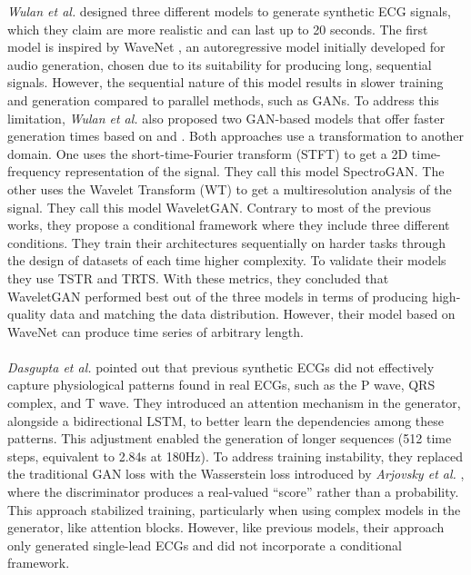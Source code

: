 \textit{Wulan et al.} \cite{wulan_generating_2020} designed three different models to generate synthetic ECG signals, which they claim are more realistic and can last up to 20 seconds. The first model is inspired by WaveNet \cite{oord_wavenet_2016}, an autoregressive model initially developed for audio generation, chosen due to its suitability for producing long, sequential signals. However, the sequential nature of this model results in slower training and generation compared to parallel methods, such as GANs. To address this limitation, \textit{Wulan et al.} also proposed two GAN-based models that offer faster generation times based on \cite{radford_unsupervised_2016} and \cite{gulrajani_improved_2017}. Both approaches use a transformation to another domain. One uses the short-time-Fourier transform (STFT) to get a 2D time-frequency representation of the signal. They call this model SpectroGAN. The other uses the Wavelet Transform (WT) to get a multiresolution analysis of the signal. They call this model WaveletGAN. Contrary to most of the previous works, they propose a conditional framework where they include three different conditions. They train their architectures sequentially on harder tasks through the design of datasets of each time higher complexity. To validate their models they use TSTR and TRTS. With these metrics, they concluded that WaveletGAN performed best out of the three models in terms of producing high-quality data and matching the data distribution. However, their model based on WaveNet can produce time series of arbitrary length.
\\ \\
\textit{Dasgupta et al.} \cite{dasgupta_cardiogan_2021} pointed out that previous synthetic ECGs did not effectively capture physiological patterns found in real ECGs, such as the P wave, QRS complex, and T wave. They introduced an attention mechanism in the generator, alongside a bidirectional LSTM, to better learn the dependencies among these patterns. This adjustment enabled the generation of longer sequences (512 time steps, equivalent to 2.84s at 180Hz). To address training instability, they replaced the traditional GAN loss \cite{goodfellow_generative_2014} with the Wasserstein loss introduced by \textit{Arjovsky et al.} \cite{arjovsky_wasserstein_2017}, where the discriminator produces a real-valued “score” rather than a probability. This approach stabilized training, particularly when using complex models in the generator, like attention blocks. However, like previous models, their approach only generated single-lead ECGs and did not incorporate a conditional framework.

